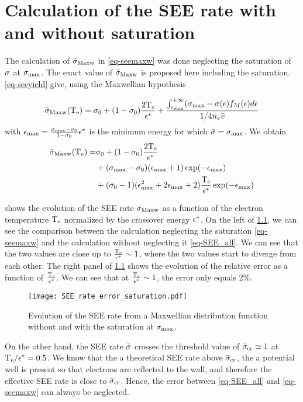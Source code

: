 
\chapter{Calculation of the SEE rate with and without saturation}
\label{an-SEE_exact}

The calculation of $ \bar{\sigma }_{\rm Maxw}$ in \cref{eq-seemaxw} was done neglecting the saturation of $\sigma $ at $\sigma_{\rm max}$.
The exact value of  $ \bar{\sigma }_{\rm Maxw}$ is proposed here including the saturation.
\cref{eq-seeyield} give, using the Maxwellian hypothesis

\begin{equation} \label{eq-SEE_sat}
   \bar{\sigma }_{\rm Maxw}(\mathrm{T_e}) = \sigma _0 + (1 - \sigma _0) \frac{2 \mathrm{T_e}}{\epsilon^{*}} + \frac{\int_{\epsilon_{\max}}^{+ \infty} (\sigma _{\rm max}  - \sigma (\epsilon) f_M(\epsilon) d\epsilon}{1/4 n_e \bar{v}}
\end{equation}
with  $\epsilon_{\max}= \frac{\sigma _{\rm max}  - \sigma _0}{1 - \sigma _0} \epsilon^{*} $ is the minimum energy for which $ \bar{\sigma } = \sigma _{\rm max} $.
We obtain
\begin{align}  \label{eq-SEE_all}
   \bar{\sigma }_{\rm Maxw}(\mathrm{T_e}) =& \sigma _0 + (1 - \sigma _0) \frac{2 \mathrm{T_e}}{\epsilon^{*}} \\
  & + (\sigma _{\rm max}  - \sigma _0) (\epsilon_{\max} + 1 )\exp(- \epsilon_{\max}) \\
  & + (\sigma _0-1) (\epsilon_{\max}^2 +2\epsilon_{\max} + 2)\frac{\mathrm{T_e}}{\epsilon^{*}} \exp(-\epsilon_{\max}) 
\end{align}

 shows the evolution of the \ac{SEE} rate $ \bar{\sigma }_{\rm Maxw}$ as a function of the electron temperature $\mathrm{T_e}$ normalized by the crossover energy $\epsilon^{*}$.
On the left of \cref{fig-see_error}, we can see the comparison between the calculation neglecting the saturation  \cref{eq-seemaxw} and the calculation without neglecting it  \cref{eq-SEE_all}.
We can see that the two values are close up to $\frac{\mathrm{T_e}}{\epsilon^{*}}\sim 1$, where the two values start to diverge from each other.
The right panel of \cref{fig-see_error} shows the evolution of the relative error as a function of $\frac{\mathrm{T_e}}{\epsilon^{*}}$.
We can see that at $\frac{\mathrm{T_e}}{\epsilon^{*}}\sim 1$, the error only equals 2\%.
\begin{figure}[hbtp]
  \centering
  \texttt{[image: SEE\_rate\_error\_saturation.pdf]}
  \caption{Evolution of the \acs{SEE} rate from a Maxwellian distribution function without and with the saturation at $\sigma_{\rm max}$.}
  \label{fig-see_error}
\end{figure}

On the other hand, the \ac{SEE} rate $ \bar{\sigma }$ crosses the threshold value of $ \bar{\sigma }_{\rm cr} \simeq 1$ at $\mathrm{T_e}/\epsilon^{*} = 0.5$.
We know that the a theoretical \ac{SEE} rate above $ \bar{\sigma }_{\rm cr}$, the a potential well is present so that electrons are reflected to the wall, and therefore the effective \ac{SEE} rate is close to $ \bar{\sigma }_{\rm cr}$.
Hence, the error between  \cref{eq-SEE_all} and \cref{eq-seemaxw} can always be neglected.
